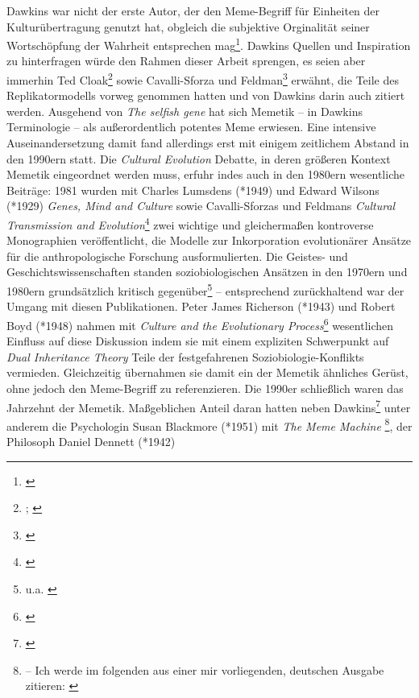 \documentclass[openany,twoside,twocolumn]{book}
\let\rmarkdownfootnote\footnote%
\def\footnote{\protect\rmarkdownfootnote}
\begin{document}
Dawkins war nicht der erste Autor, der den Meme-Begriff für Einheiten
der Kulturübertragung genutzt hat, obgleich die subjektive Orginalität
seiner Wortschöpfung der Wahrheit entsprechen mag\footnote{\textcite{laurent_note_1999}}.
Dawkins Quellen und Inspiration zu hinterfragen würde den Rahmen dieser
Arbeit sprengen, es seien aber immerhin Ted Cloak\footnote{\textcite{cloak_cultural_1966};
  \textcite{cloak_is_1975}} sowie Cavalli-Sforza und Feldman\footnote{\textcite{cavalli-sforza_models_1973}}
erwähnt, die Teile des Replikatormodells vorweg genommen hatten und von
Dawkins darin auch zitiert werden. Ausgehend von \emph{The selfish gene}
hat sich Memetik -- in Dawkins Terminologie -- als außerordentlich
potentes Meme erwiesen. Eine intensive Auseinandersetzung damit fand
allerdings erst mit einigem zeitlichem Abstand in den 1990ern statt. Die
\emph{Cultural Evolution} Debatte, in deren größeren Kontext Memetik
eingeordnet werden muss, erfuhr indes auch in den 1980ern wesentliche
Beiträge: 1981 wurden mit Charles Lumsdens (*1949) und Edward Wilsons
(*1929) \emph{Genes, Mind and Culture} \autocite[ -- Lumsden und Wilson
führen mit \emph{Culturgen} eine dem Meme ähnliche Beobachtungseinheit
ein.]{lumsden_genes_1981} sowie Cavalli-Sforzas und Feldmans
\emph{Cultural Transmission and Evolution}\footnote{\textcite{cavalli-sforza_cultural_1981}}
zwei wichtige und gleichermaßen kontroverse Monographien veröffentlicht,
die Modelle zur Inkorporation evolutionärer Ansätze für die
anthropologische Forschung ausformulierten. Die Geistes- und
Geschichtswissenschaften standen soziobiologischen Ansätzen in den
1970ern und 1980ern grundsätzlich kritisch gegenüber\footnote{u.a.
  \textcite{sahlins_use_1976}} -- entsprechend zurückhaltend war der
Umgang mit diesen Publikationen. Peter James Richerson (*1943) und
Robert Boyd (*1948) nahmen mit \emph{Culture and the Evolutionary
Process}\footnote{\textcite{boyd_culture_1985}} wesentlichen Einfluss
auf diese Diskussion indem sie mit einem expliziten Schwerpunkt auf
\emph{Dual Inheritance Theory} Teile der festgefahrenen
Soziobiologie-Konflikts vermieden. Gleichzeitig übernahmen sie damit ein
der Memetik ähnliches Gerüst, ohne jedoch den Meme-Begriff zu
referenzieren. Die 1990er schließlich waren das Jahrzehnt der Memetik.
Maßgeblichen Anteil daran hatten neben Dawkins\footnote{\textcite{dawkins_viruses_1993}}
unter anderem die Psychologin Susan Blackmore (*1951) mit \emph{The Meme
Machine} \footnote{\textcite{blackmore_meme_1999} -- Ich werde im
  folgenden aus einer mir vorliegenden, deutschen Ausgabe zitieren:
  \textcite{blackmore_macht_2000}}, der Philosoph Daniel Dennett (*1942)
\end{document}

